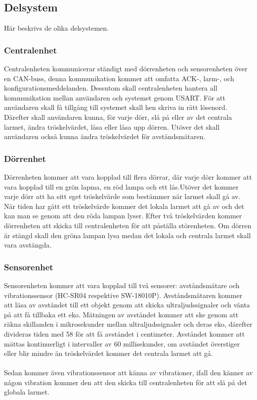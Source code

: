 \documentclass{article}
\begin{document}
\subsection{Delsystem}
Här beskrivs de olika delsystemen.
\subsubsection{Centralenhet}
Centralenheten kommunicerar ständigt med dörrenheten och sensorenheten över en CAN-buss, denna kommunikation kommer att omfatta ACK-, larm-, och konfigurationsmeddelanden. 
Dessutom skall centralenheten hantera all kommunikation mellan användaren och systemet genom USART. För att användaren skall få tillgång till systemet skall hen skriva in rätt lösenord. 
Därefter skall användaren kunna, för varje dörr, slå på eller av det centrala larmet, ändra tröskelvärdet, låsa eller låsa upp dörren. 
Utöver det skall användaren också kunna ändra tröskelvärdet för avståndsmätaren.



\subsubsection{Dörrenhet}

Dörrenheten kommer att vara kopplad till flera dörrar, där varje dörr kommer att vara kopplad till en grön lapma, en röd lampa och ett lås.Utöver det kommer varje dörr att ha sitt eget tröskelvärde som bestämmer när larmet skall gå av. 
När tiden har gått ett tröskelvärde kommer det lokala larmet att gå av och det kan man se genom att den röda lampan lyser. 
Efter två tröskelvärden kommer dörrenheten att skicka till centralenheten för att påställa störenheten. 
Om dörren är stängd skall den gröna lampan lysa medan det lokala och centrala larmet skall vara avstängda. 

\subsubsection{Sensorenhet}

Sensorenheten kommer att vara kopplad till två sensorer: avståndsmätare och vibrationssensor (HC-SR04 respektive SW-18010P).
Avståndsmätaren kommer att läsa av avståndet till ett objekt genom att skicka ultraljudssignaler och vänta på att få tillbaka ett eko. 
Mätningen av avståndet kommer att ske genom att räkna skillanden i mikrosekunder mellan ultraljudssignaler och deras eko, därefter divideras tiden med 58 för att få avståndet i centimeter. 
Avståndet kommer att mättas kontinuerligt i intervaller av 60 millisekunder, om avståndet överstiger eller blir mindre än tröskelvärdet kommer det centrala larmet att gå.\\
\\
Sedan kommer även vibrationssensor att känna av vibrationer, ifall den känner av någon vibration kommer den att den skicka till centralenheten för att slå på det globala larmet.
\end{document}
